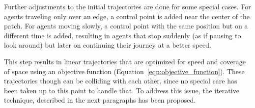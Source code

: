 Further adjustments to the initial trajectories are done for some special cases.
For agents traveling only over an edge, a control point is added near the center of the patch.
For agents moving slowly, a control point with the same position but on a different time is added, resulting in agents that stop suddenly (as if pausing to look around) but later on continuing their journey at a better speed.

 
This step results in linear trajectories that are optimized for speed and coverage of space using an objective function (Equation~\ref{eqn:objective_function}).
 These trajectories though can be colliding with each other, since no special care has been taken up to this point to handle that. To address this issue, the iterative technique, described in the next paragraphs has been proposed.

% 
% 
% 
% 
% 
% 
%  
% 

